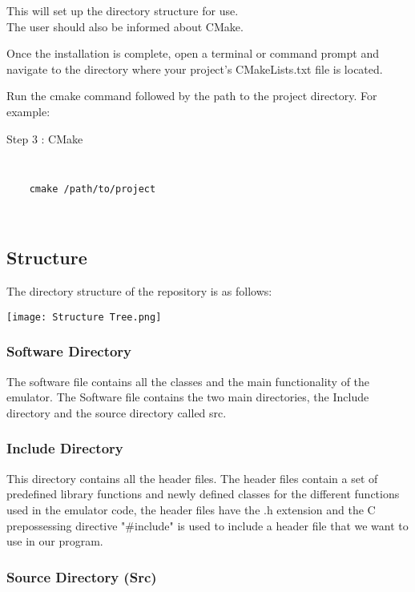 \documentclass[12pt]{article}
\numberwithin{equation}{section}
\numberwithin{figure}{section}
\begin{document}
This will set up the directory structure for use.  \\ 

The user should also be informed about CMake. 

Once the installation is complete, open a terminal or command prompt and navigate to the directory where your project's CMakeLists.txt file is located.

Run the cmake command followed by the path to the project directory. For example:

\begin{description}
\item[Step 3 : CMake]
\end{description}

{\tt 
\begin{verbatim}
    cmake /path/to/project 
\end{verbatim}
}

\\


\subsection{Structure}

The directory structure of the repository is as follows: 

\texttt{[image: Structure Tree.png]}


\subsubsection{Software Directory}

The software file contains all the classes and the main functionality of the emulator. The Software file contains the two main directories, the Include directory and the source directory called src.

\subsubsection{Include Directory}

This directory contains all the header files. The header files contain a set of predefined library functions and newly defined classes for the different functions used in the emulator code, the header files have the .h extension and the C prepossessing directive "\#include" is used to include a header file that we want to use in our program.

\subsubsection{Source Directory (Src)}
\end{document}
